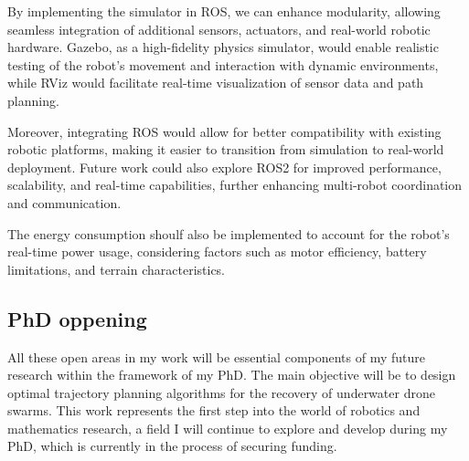 \documentclass[../main.tex]{subfiles}
\begin{document}
\vspace{1em}

By implementing the simulator in ROS, we can enhance modularity, allowing seamless integration of additional sensors, actuators, and real-world robotic hardware. Gazebo, as a high-fidelity physics simulator, would enable realistic testing of the robot's movement and interaction with dynamic environments, while RViz would facilitate real-time visualization of sensor data and path planning.

\vspace{1em}

Moreover, integrating ROS would allow for better compatibility with existing robotic platforms, making it easier to transition from simulation to real-world deployment. Future work could also explore ROS2 for improved performance, scalability, and real-time capabilities, further enhancing multi-robot coordination and communication.

\vspace{1em}

The energy consumption shoulf also be implemented to account for the robot's real-time power usage, considering factors such as motor efficiency, battery limitations, and terrain characteristics.

\subsection*{PhD oppening}
All these open areas in my work will be essential components of my future research within the framework of my PhD. The main objective will be to design optimal trajectory planning algorithms for the recovery of underwater drone swarms. This work represents the first step into the world of robotics and mathematics research, a field I will continue to explore and develop during my PhD, which is currently in the process of securing funding.
\end{document}
